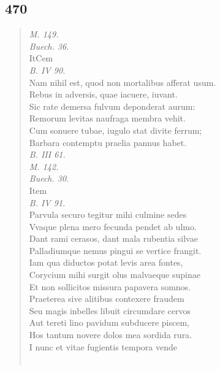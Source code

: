 \documentclass[11pt, a4paper]{report}
\begin{document}
            \subsection*{470}
      \begin{verse}
      \textit{M. 149.} \\ \textit{Buech. 36.} \\ ItCem \\ \textit{B. IV 90.} \\ Nam nihil est, quod non mortalibus afferat usum. \\ Rebus in adversis, quae iacuere, iuvant. \\ Sic rate demersa fulvum deponderat aurum: \\ Remorum levitas naufraga membra vehit. \\ Cum sonuere tubae, iugulo stat divite ferrum; \\ Barbara contemptu praelia pannus habet. \\ \textit{B. III 61.} \\ \textit{M. 142.} \\ \textit{Buech. 30.} \\ Item \\ \textit{B. IV 91.} \\ Parvula securo tegitur mihi culmine sedes \\ Vvaque plena mero fecunda pendet ab ulmo. \\ Dant rami cerasos, dant mala rubentia silvae \\ Palladiumque nemus pingui se vertice frangit. \\ Iam qua diductos potat levis area fontes, \\ Corycium mihi surgit olus malvaeque supinae \\ Et non sollicitos missura papavera somnos. \\ Praeterea sive alitibus contexere fraudem \\ Seu magis inbelles libuit circumdare cervos \\ Aut tereti lino pavidum subducere piscem, \\ Hos tantum novere dolos mea sordida rura. \\ I nunc et vitae fugientis tempora vende \\ 
        ﻿\pagebreak 

\end{verse}
\end{document}
